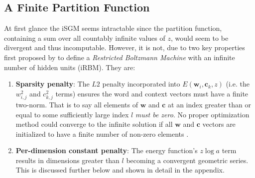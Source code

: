 \documentclass{article} %
\begin{document}
\subsection{A Finite Partition Function}
At first glance the iSGM seems intractable since the partition function, containing a sum over all countably infinite values of $z$, would seem to be divergent and thus incomputable.  However, it is not, due to two key properties first proposed by \cite{cote2015infinite} to define a \textit{Restricted Boltzmann Machine} with an infinite number of hidden units (iRBM).  They are: \begin{enumerate}
  \item \textbf{Sparsity penalty}: The $L2$ penalty incorporated into $E(\mathbf{w}_{i}, \mathbf{c}_{k}, z)$ (i.e. the $w_{i,j}^{2}$ and $c_{k,j}^{2}$ terms) ensures the word and context vectors must have a finite two-norm.  That is to say all elements of $\mathbf{w}$ and $\mathbf{c}$ at an index greater than or equal to some sufficiently large index $l$ \emph{must be zero}.  No proper optimization method could converge to the infinite solution if all $\mathbf{w}$ and $\mathbf{c}$ vectors are initialized to have a finite number of non-zero elements \citep{cote2015infinite}.
  \item \textbf{Per-dimension constant penalty}:  The energy function's $z\log a$ term results in dimensions greater than $l$ becoming a convergent geometric series.  This is discussed further below and shown in detail in the appendix.  
\end{enumerate}
\end{document}
